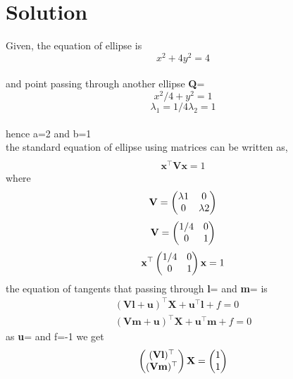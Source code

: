  \section{Solution}
 \begin{center}
     Given,
      the equation of ellipse is \begin{equation}
      x^2+4y^2=4 
      \end{equation}
      \\ and point passing through another ellipse \textbf{Q}=
      \begin{equation}
       x^2/4+y^2=1  
       \end{equation}
       \begin{equation}
       {\lambda}_{1}=1/4 
       {\lambda}_{2}=1
      \end{equation}
      \\ hence a=2 and b=1
       \\ the standard equation of ellipse using matrices can be written as,
       \begin{align}
    \\\textbf{x}^{\top}\textbf{V}\textbf{x}=1
    \end{align}
      where 
      \begin{equation}
      \textbf{V}=\begin{pmatrix}\lambda1 & 0 \\ 0 & \lambda2\end{pmatrix} 
      \end{equation}
      \begin{equation}
      \textbf{V}=\begin{pmatrix}1/4 & 0 \\ 0 & 1\end{pmatrix}
      \end{equation}
      \begin{equation}
      \textbf{x}^{\top}\begin{pmatrix}1/4 & 0 \\ 0 & 1\end{pmatrix}\textbf{x}=1
      \end{equation}
      the equation of tangents that passing through \textbf{l}= and \textbf{m}= is 
      \begin{align}
  (\textbf{V}\textbf{l}+\textbf{u})^{\top}\textbf{X}+\textbf{u}^{\top}\textbf{l}+f=0
  \\ (\textbf{V}\textbf{m}+\textbf{u})^{\top}\textbf{X}+\textbf{u}^{\top}\textbf{m}+f=0
   \end{align}
   as \textbf{u}= and f=-1 we get
   \begin{equation}
    \myvec{(\textbf{V}\textbf{l})^{\top} \\ (\textbf{V}\textbf{m})^{\top}}\textbf{X}=\myvec{1\\1}

\end{equation}
\end{center}

